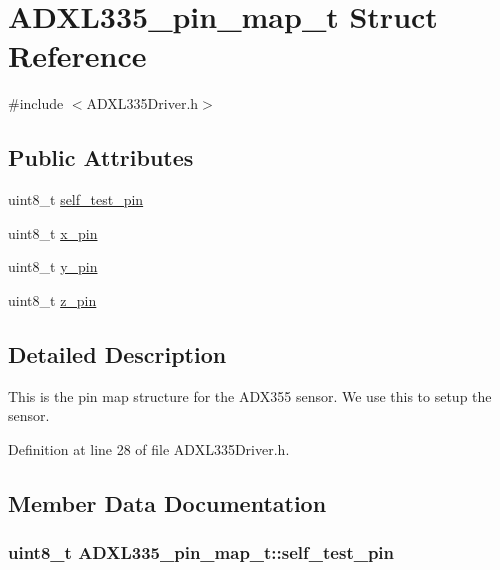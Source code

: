 \hypertarget{struct_a_d_x_l335__pin__map__t}{\section{\-A\-D\-X\-L335\-\_\-pin\-\_\-map\-\_\-t \-Struct \-Reference}
\label{struct_a_d_x_l335__pin__map__t}
}


{\ttfamily \#include $<$\-A\-D\-X\-L335\-Driver.\-h$>$}

\subsection*{\-Public \-Attributes}
\begin{DoxyCompactItemize}
\item 
uint8\-\_\-t \hyperlink{struct_a_d_x_l335__pin__map__t_aaca97b615f3dd83ff8bd871dd20c1a8d}{self\-\_\-test\-\_\-pin}
\item 
uint8\-\_\-t \hyperlink{struct_a_d_x_l335__pin__map__t_afef2093e06a55328500a75af2935ec1e}{x\-\_\-pin}
\item 
uint8\-\_\-t \hyperlink{struct_a_d_x_l335__pin__map__t_a85e0d796ba1d6bcf71c0051034111bce}{y\-\_\-pin}
\item 
uint8\-\_\-t \hyperlink{struct_a_d_x_l335__pin__map__t_a185fe002f0600ecb6a8126b626de569a}{z\-\_\-pin}
\end{DoxyCompactItemize}


\subsection{\-Detailed \-Description}
\-This is the pin map structure for the \-A\-D\-X355 sensor. \-We use this to setup the sensor. 

\-Definition at line 28 of file \-A\-D\-X\-L335\-Driver.\-h.



\subsection{\-Member \-Data \-Documentation}
\hypertarget{struct_a_d_x_l335__pin__map__t_aaca97b615f3dd83ff8bd871dd20c1a8d}{
\subsubsection[{self\-\_\-test\-\_\-pin}]{\setlength{\rightskip}{0pt plus 5cm}uint8\-\_\-t {\bf \-A\-D\-X\-L335\-\_\-pin\-\_\-map\-\_\-t\-::self\-\_\-test\-\_\-pin}}}\label{struct_a_d_x_l335__pin__map__t_aaca97b615f3dd83ff8bd871dd20c1a8d}


